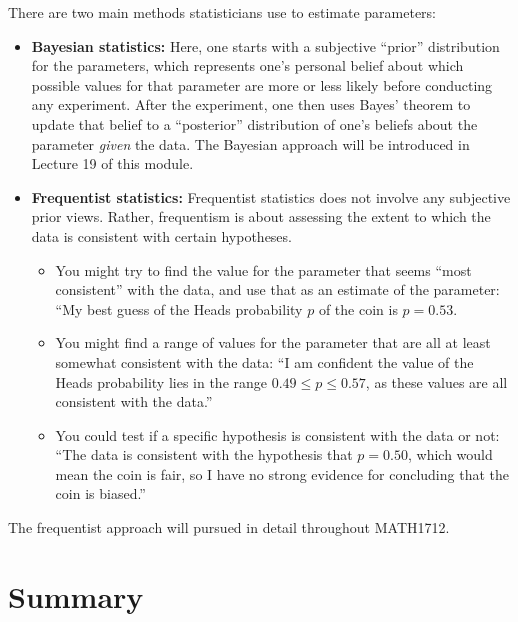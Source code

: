 \documentclass[
  a4paper,
]{book}
\providecommand{\tightlist}{%
  \setlength{\itemsep}{0pt}\setlength{\parskip}{0pt}}
\theoremstyle{definition}
\theoremstyle{definition}
\theoremstyle{definition}
\theoremstyle{definition}
\theoremstyle{remark}
\begin{document}
There are two main methods statisticians use to estimate parameters:

\begin{itemize}
\item
  \textbf{Bayesian statistics:} Here, one starts with a subjective ``prior'' distribution for the parameters, which represents one's personal belief about which possible values for that parameter are more or less likely before conducting any experiment. After the experiment, one then uses Bayes' theorem to update that belief to a ``posterior'' distribution of one's beliefs about the parameter \emph{given} the data. The Bayesian approach will be introduced in Lecture 19 of this module.
\item
  \textbf{Frequentist statistics:} Frequentist statistics does not involve any subjective prior views. Rather, frequentism is about assessing the extent to which the data is consistent with certain hypotheses.

  \begin{itemize}
  \tightlist
  \item
    You might try to find the value for the parameter that seems ``most consistent'' with the data, and use that as an estimate of the parameter: ``My best guess of the Heads probability \(p\) of the coin is \(p = 0.53\).
  \item
    You might find a range of values for the parameter that are all at least somewhat consistent with the data: ``I am confident the value of the Heads probability lies in the range \(0.49 \leq p \leq 0.57\), as these values are all consistent with the data.''
  \item
    You could test if a specific hypothesis is consistent with the data or not: ``The data is consistent with the hypothesis that \(p = 0.50\), which would mean the coin is fair, so I have no strong evidence for concluding that the coin is biased.''
  \end{itemize}
\end{itemize}

The frequentist approach will pursued in detail throughout MATH1712.

\hypertarget{summary-06}{%
\section*{Summary}\label{summary-06}}
\end{document}
